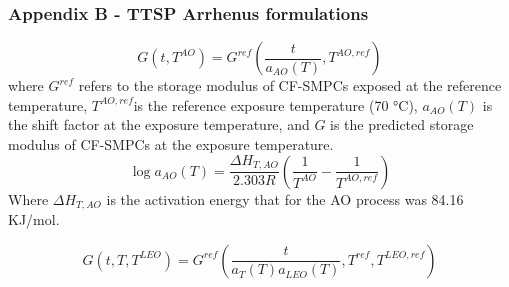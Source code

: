 \documentclass[10pt]{beamer}
\begin{document}
\begin{frame}
\frametitle{Appendix B - TTSP Arrhenus formulations}

\begin{equation}\label{eq:1}
G(t,T^{AO}) = G^{ref}\left(\dfrac{t}{a_{AO}(T)}, T^{AO, ref}\right)
\end{equation}
where $G^{ref}$ refers to the storage modulus of CF-SMPCs exposed at the reference temperature,
$T^{AO, ref}$is the reference exposure temperature (70 \si{\degreeCelsius}), $a_{AO}(T)$ is the shift factor at
the exposure temperature, and $G$ is the predicted storage modulus of CF-SMPCs at the
exposure temperature.
\begin{equation}\label{eq:2}
\log a_{AO}(T) = \dfrac{\Delta H_{T, AO}}{2.303R}\left(\dfrac{1}{T^{AO}} - \dfrac{1}{T^{AO, ref}} \right)
\end{equation}
Where $\Delta H_{T, AO}$ is the activation energy that for the AO process was 84.16 KJ/mol.
\end{frame}

\begin{frame}
\begin{equation}\label{eq:3}
G(t,T,T^{LEO}) = G^{ref}\left(\dfrac{t}{a_T(T)a_{LEO}(T)}, T^{ref}, T^{LEO, ref}\right)
\end{equation}
\end{frame}
\end{document}
